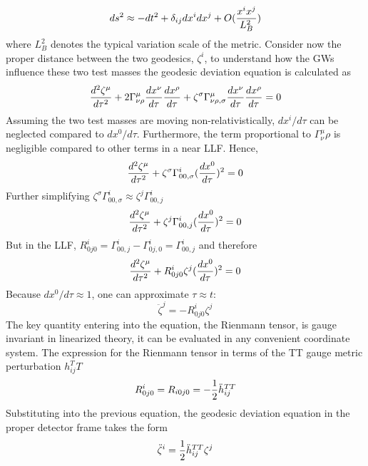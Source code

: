 \documentclass[binding=0.6cm, LaM]{sapthesis}
\begin{document}
\begin{equation}
ds^2 \approx -dt^2 + \delta_{ij}dx^i dx^j + O({{x^ix^j}\over{L^2_B}})
\end{equation}
where $L^2_B$ denotes the typical variation scale of the metric.
Consider now the proper distance between the two geodesics, $\zeta^i$, to understand how the GWs influence these two test masses the geodesic deviation equation is calculated as 
\begin{equation}
{{d^2\zeta^{\mu}}\over{d\tau^2}} + 2\Gamma^{\mu}_{\nu\rho}{{dx^{\nu}}\over{d\tau}}{{dx^\rho}\over{d\tau}} + \zeta^{\sigma}\Gamma^{\mu}_{\nu\rho,\sigma}{{dx^{\nu}}\over{d\tau}}{{dx^{\rho}}\over{d\tau}} = 0
\end{equation}
Assuming the two test masses are moving non-relativistically, $dx^i/d\tau$ can be neglected compared to $dx^0/d\tau$. 
Furthermore, the term proportional to $\Gamma^{\mu}_\nu\rho{}$ is negligible compared to other terms in a near LLF. Hence,
\begin{equation}
{{d^2\zeta^{\mu}}\over{d\tau^2}} + \zeta^{\sigma}\Gamma^{i}_{00, \sigma}({{dx^0}\over{d\tau}})^2 = 0
\end{equation}
Further simplifying $\zeta^{\sigma}\Gamma^{i}_{00, \sigma} \approx \zeta^{j}\Gamma^{i}_{00, j}$
\begin{equation}
{{d^2\zeta^{\mu}}\over{d\tau^2}} + \zeta^{j}\Gamma^{i}_{00,j}({{dx^0}\over{d\tau}})^2 = 0
\end{equation}
But in the LLF, $R^i_{0j0} = \Gamma^i_{00,j} - \Gamma^i_{0j,0} = \Gamma^i_{00,j}$ and therefore
\begin{equation}
{{d^2\zeta^{\mu}}\over{d\tau^2}} + R^i_{0j0} \zeta^j({{dx^0}\over{d\tau}})^2 = 0
\end{equation}
Because $dx^0/d\tau \approx 1$, one can approximate $\tau \approx t$:
\begin{equation}
{\ddot \zeta}^j = - R^i_{0j0}\zeta^j
\end{equation}
The key quantity entering into the equation, the Rienmann tensor, is gauge invariant in linearized theory, it can be evaluated in any convenient coordinate system. 
The expression for the Rienmann tensor in terms of the TT gauge metric perturbation $h_{ij}^TT$
\begin{equation}
R^i_{0j0} = R_{i0j0} = - {1 \over 2}{\ddot h}_{ij}^{TT}
\end{equation}
Substituting into the previous equation, the geodesic deviation equation in the proper detector frame takes the form
\begin{equation}
{\ddot \zeta}^i = {1 \over 2}{\ddot h}_{ij}^{TT}\zeta^j
\end{equation}
\end{document}
